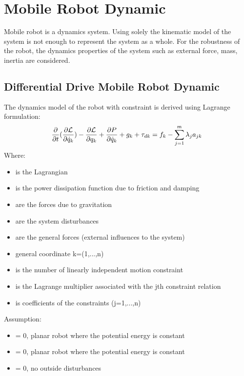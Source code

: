 \chapter{Mobile Robot Dynamic}
Mobile robot is a dynamics system. Using solely the kinematic model of the system is not enough to represent the system as a whole. For the robustness of the robot, the dynamics properties of the system such as external force, mass, inertia are considered.

\section{Differential Drive Mobile Robot Dynamic}

\begin{tcolorbox}[title=Lagrangain Formula,breakable]
	The dynamics model of the robot with constraint is derived using Lagrange formulation:
	\begin{equation}{\label{eq:lagrangain eq full}}
		\frac{\partial}{\partial t}(\frac{\partial \mathcal{L}}{\partial \Dot{q}_k})- \frac{\partial \mathcal{L}}{\partial q_k} + \frac{\partial P}{\partial \Dot{q}_k} + g_k + \tau_{dk}= f_k - \sum_{j=1}^{m}\lambda_j a_{jk}
	\end{equation}
	Where:
	\begin{itemize}
		\item { is the Lagrangian}
		\item { is the power dissipation function due to friction and damping}
		\item { are the forces due to gravitation}
		\item { are the system disturbances}
		\item { are the general forces (external influences to the system)}
		\item { general coordinate k=(1,...,n)}
		\item { is the number of linearly independent motion constraint}
		\item { is the Lagrange multiplier associated with the jth constraint relation}
		\item { is coefficients of the constraints (j=1,...,n)}
	\end{itemize}
	\break
	Assumption:
	\begin{itemize}
		\item { = 0, planar robot where the potential energy is constant}
		\item { = 0, planar robot where the potential energy is constant}
		\item { = 0, no outside disturbances}
	\end{itemize}
\end{tcolorbox}


